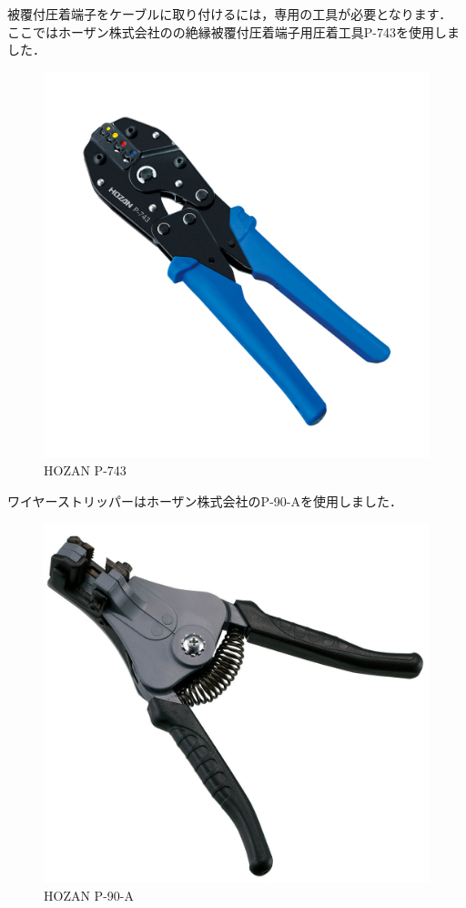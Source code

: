 \documentclass[{../../master}]{subfiles}
\begin{document}
被覆付圧着端子をケーブルに取り付けるには，専用の工具が必要となります．
ここではホーザン株式会社のの絶縁被覆付圧着端子用圧着工具P-743を使用しました．

\begin{figure}[ht]
  \centering
  \includegraphics[height=50truemm]{images/P-743.jpg}
  \caption{HOZAN P-743}
\end{figure}

ワイヤーストリッパーはホーザン株式会社のP-90-Aを使用しました．

\begin{figure}[ht]
  \centering
  \includegraphics[height=50truemm]{images/P-90-series.jpg}
  \caption{HOZAN P-90-A}
\end{figure}
\end{document}
